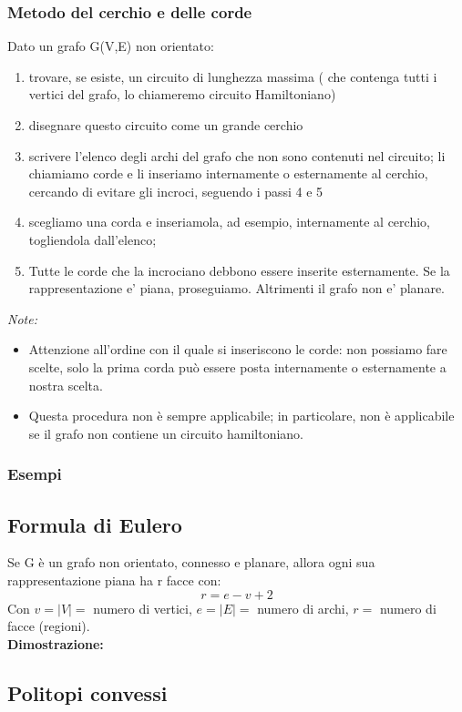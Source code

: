 \subsubsection{Metodo del cerchio e delle corde}
Dato un grafo G(V,E) non orientato:
\begin{enumerate}
\item trovare, se esiste, un circuito di lunghezza massima ( che
contenga tutti i vertici del grafo, lo chiameremo circuito
Hamiltoniano)
\item disegnare questo circuito come un grande cerchio
\item scrivere l'elenco degli archi del grafo che non sono
contenuti nel circuito; li chiamiamo corde e li inseriamo
internamente o esternamente al cerchio, cercando di
evitare gli incroci, seguendo i passi 4 e 5
\item scegliamo una corda e inseriamola, ad esempio,
internamente al cerchio, togliendola dall'elenco;
\item Tutte le corde che la incrociano debbono essere inserite
esternamente. Se la rappresentazione e' piana,
proseguiamo. Altrimenti il grafo non e' planare.
\end{enumerate}
\emph{Note:}
\begin{itemize}
\item Attenzione all'ordine con il quale si inseriscono le corde:
non possiamo fare scelte, solo la prima corda può essere
posta internamente o esternamente a nostra scelta.
\item Questa procedura non è sempre applicabile; in
particolare, non è applicabile se il grafo non contiene un
circuito hamiltoniano.
\end{itemize}

\subsubsection{Esempi}

\subsection{Formula di Eulero}
Se G è un grafo non orientato, connesso e planare, allora ogni sua rappresentazione piana ha r facce con:
\[r = e -v + 2\]
Con \(v = |V| = \) numero di vertici,
\(e = |E| =\) numero di archi,
\(r =\) numero di facce (regioni). \\

\noindent
\textbf{Dimostrazione:}

\subsection{Politopi convessi}
